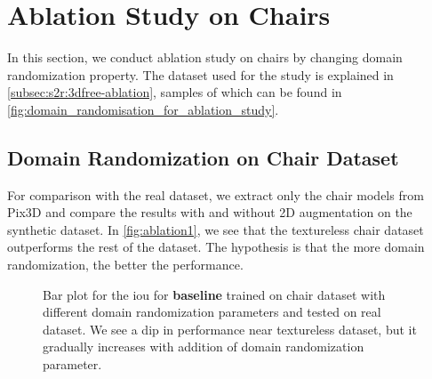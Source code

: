 \section{Ablation Study on Chairs}\label{sec:ablation-study-on-chairs}
In this section, we conduct ablation study on chairs by changing domain randomization property.
The dataset used for the study is explained in \autoref{subsec:s2r:3dfree-ablation}, samples of which can be found in \autoref{fig:domain_randomisation_for_ablation_study}.

\subsection{Domain Randomization on Chair Dataset}\label{subsec:domain-randomisation-on-chair-dataset}
For comparison with the real dataset, we extract only the chair models from Pix3D and compare the results  with and without 2D augmentation on the synthetic dataset.
In \autoref{fig:ablation1}, we see that the textureless chair dataset outperforms the rest of the dataset.
The hypothesis is that the more domain randomization, the better the performance.

\begin{figure}[ht]
    \centering
    \resizebox{0.9\textwidth}{!}{}
    \caption[\gls{iou} Comparison for Ablation Datasets.]{Bar plot for the \gls{iou} for \textbf{baseline} trained on chair dataset with different domain randomization parameters and tested on real dataset.
    We see a dip in performance near textureless dataset, but it gradually increases with addition of domain randomization parameter.}
    \label{fig:ablation1}
\end{figure}


